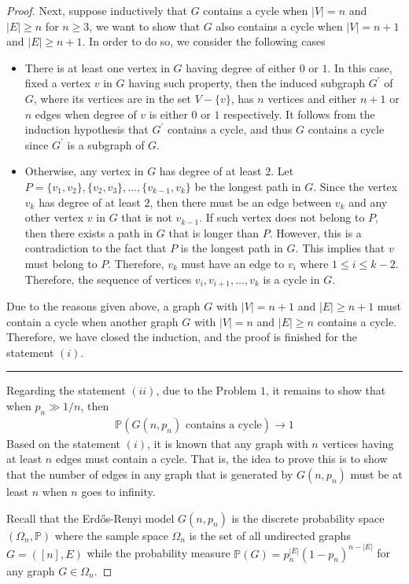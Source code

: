 \begin{proof}
  Next, suppose inductively that $G$ contains a cycle when $|V| = n$ and $|E| \geq n$ for $n \geq 3$, we want to show that $G$ also contains a cycle when $|V| = n+1$ and $|E| \geq n+1$. In order to do so, we consider the following cases
  \begin{itemize}
    \item There is at least one vertex in $G$ having degree of either $0$ or $1$. In this case, fixed a vertex $v$ in $G$ having such property, then the induced subgraph $G^{'}$ of $G$, where its vertices are in the set $V - \{v\}$, has $n$ vertices and either $n+1$ or $n$ edges when degree of $v$ is either $0$ or $1$ respectively. It follows from the induction hypothesis that $G^{'}$ contains a cycle, and thus $G$ contains a cycle since $G^{'}$ is a subgraph of $G$.
    \item  Otherwise, any vertex in $G$ has degree of at least $2$. Let $P = \{v_{1},v_{2}\}, \{v_{2},v_{3}\}, \ldots, \{v_{k-1},v_{k}\}$ be the longest path in $G$. Since the vertex $v_{k}$ has degree of at least $2$, then there must be an edge between $v_{k}$ and any other vertex $v$ in $G$ that is not $v_{k-1}$. If such vertex does not belong to $P$, then there exists a path in $G$ that is longer than $P$. However, this is a contradiction to the fact that $P$ is the longest path in $G$. This implies that $v$ must belong to $P$. Therefore, $v_{k}$ must have an edge to $v_{i}$ where $1 \leq i \leq k-2$. Therefore, the sequence of vertices $v_{i},v_{i+1},\ldots,v_{k}$ is a cycle in $G$. 
  \end{itemize}
  Due to the reasons given above, a graph $G$ with $|V| = n+1$ and $|E| \geq n+1$ must contain a cycle when another graph $G$ with $|V| = n$ and $|E| \geq n$ contains a cycle. Therefore, we have closed the induction, and the proof is finished for the statement $(i)$.
  \vspace{5pt}
  \hrule
  Regarding the statement $(ii)$, due to the Problem $1$, it remains to show that when $p_{n} \gg 1/n$, then
  \begin{align*}
    \mathbb{P}(G(n,p_{n}) \text{ contains a cycle}) \to 1
  \end{align*}
  Based on the statement $(i)$, it is known that any graph with $n$ vertices having at least $n$ edges must contain a cycle. That is, the idea to prove this is to show that the number of edges in any graph that is generated by $G(n,p_{n})$ must be at least $n$ when $n$ goes to infinity. 

  Recall that the Erdős-Renyi model $G(n, p_{n})$ is the discrete probability space $(\Omega_{n}, \mathbb{P})$ where the sample space $\Omega_{n}$ is the set of all undirected graphs $G = ([n], E)$ while the probability measure $\mathbb{P}(G) = p_{n}^{|E|} (1 - p_{n})^{n - |E|}$ for any graph $G \in \Omega_{n}$. 
  

\end{proof}
